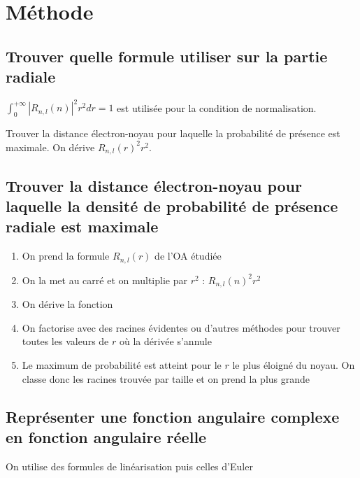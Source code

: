\documentclass[french]{yLectureNote}
\begin{document}
\section{Méthode}

\subsection{Trouver quelle formule utiliser sur la partie radiale}
 $\int_0^{+\infty} |R_{n,l}(n)|^2 r^2 dr = 1$ est utilisée pour la condition de normalisation.

 Trouver la distance électron-noyau pour laquelle la probabilité de présence est maximale. On dérive $R_{n,l}(r)^2r^2$.


\subsection{Trouver la distance électron-noyau pour laquelle la densité de probabilité de présence radiale est maximale}
\begin{enumerate}
 \item On prend la formule $R_{n,l}(r)$ de l'OA étudiée
 \item On la met au carré et on multiplie par $r^2$ : $R_{n,l}(n)^2 r^2$
 \item On dérive la fonction
 \item On factorise avec des racines évidentes ou d'autres méthodes pour trouver toutes les valeurs de $r$ où la dérivée s'annule
 \item Le maximum de probabilité est atteint pour le $r$ le plus éloigné du noyau. On classe donc les racines trouvée par taille et on prend la plus grande
\end{enumerate}

\subsection{Représenter une fonction angulaire complexe en fonction angulaire réelle}
On utilise des formules de linéarisation puis celles d'Euler\marginInfo{\[\cos(\theta) = \frac{e^{i\theta} + e^{-i\theta}}{2}\]  \[\sin(\theta) = \frac{e^{i\theta} - e^{-i\theta}}{2i}\]}
\end{document}
